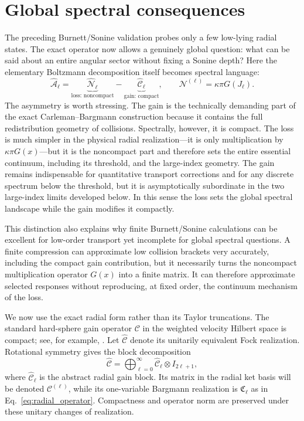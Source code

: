 \documentclass[11pt]{article}
\numberwithin{equation}{section}
\theoremstyle{definition}
\begin{document}
\section{Global spectral consequences}
\label{sec:global_spectral}

The preceding Burnett/Sonine validation probes only a few low-lying radial
states.  The exact operator now allows a genuinely global question: what can
be said about an entire angular sector without fixing a Sonine depth?  Here the elementary
Boltzmann decomposition itself becomes spectral language:
\begin{equation}
 \boxed{
 \widehat{\mathcal A}_\ell
 =\underbrace{\widehat{\mathcal N}_\ell}_{\text{loss: noncompact}}
 -\underbrace{\widehat{\mathcal C}_\ell}_{\text{gain: compact}},
 \qquad
 \mathcal N^{(\ell)}=\kappa\pi G(J_\ell).
 }
 \label{eq:global_loss_gain_roles}
\end{equation}
The asymmetry is worth stressing.  The gain is the technically demanding part
of the exact Carleman--Bargmann construction because it contains the full
redistribution geometry of collisions.  Spectrally, however, it is compact.
The loss is much simpler in the physical radial realization---it is only
multiplication by $\kappa\pi G(x)$---but it is the noncompact part and therefore
sets the entire essential continuum, including its threshold, and the
large-index geometry.  The gain remains
indispensable for quantitative transport corrections and for any discrete
spectrum below the threshold, but it is asymptotically subordinate in the two
large-index limits developed below.  In this sense the loss sets the global
spectral landscape while the gain modifies it compactly.

This distinction also explains why finite Burnett/Sonine calculations can be
excellent for low-order transport yet incomplete for global spectral
questions.  A finite compression can approximate low collision brackets very
accurately, including the compact gain contribution, but it necessarily turns
the noncompact multiplication operator $G(x)$ into a finite matrix.  It can
therefore approximate selected responses without reproducing, at fixed order,
the continuum mechanism of the loss.

We now use the exact radial form rather than its Taylor truncations.  The
standard hard-sphere gain operator $\mathcal C$ in the weighted velocity
Hilbert space is compact; see, for example,
\cite{Grad1963,Drange1975,Pekeris1963,Dudynski2013}.  Let
$\widehat{\mathcal C}$ denote its unitarily equivalent Fock realization.
Rotational symmetry gives the block decomposition
\begin{equation}
 \widehat{\mathcal C}
 =
 \bigoplus_{\ell=0}^\infty
 \widehat{\mathcal C}_\ell\otimes I_{2\ell+1},
 \label{eq:Cblocks}
\end{equation}
where $\widehat{\mathcal C}_\ell$ is the abstract radial gain block.  Its
matrix in the radial ket basis will be denoted $\mathcal C^{(\ell)}$, while
its one-variable Bargmann realization is $\mathfrak C_\ell$ as in
Eq.~\eqref{eq:radial_operator}.  Compactness and operator norm are preserved
under these unitary changes of realization.
\end{document}
